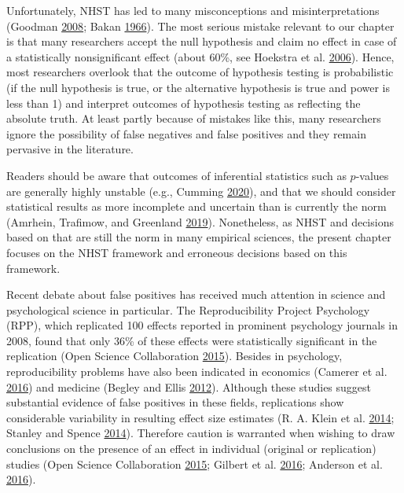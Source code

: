 \documentclass[a5paper]{book}
\begin{document}
Unfortunately, NHST has led to many misconceptions and
misinterpretations (Goodman
\protect\hyperlink{ref-doi:10.1053ux2fj.seminhematol.2008.04.003}{2008};
Bakan \protect\hyperlink{ref-doi:10.1037ux2fh0020412}{1966}). The most
serious mistake relevant to our chapter is that many researchers accept
the null hypothesis and claim no effect in case of a statistically
nonsignificant effect (about 60\%, see Hoekstra et al.
\protect\hyperlink{ref-doi:10.3758ux2fbf03213921}{2006}). Hence, most
researchers overlook that the outcome of hypothesis testing is
probabilistic (if the null hypothesis is true, or the alternative
hypothesis is true and power is less than 1) and interpret outcomes of
hypothesis testing as reflecting the absolute truth. At least partly
because of mistakes like this, many researchers ignore the possibility
of false negatives and false positives and they remain pervasive in the
literature.

Readers should be aware that outcomes of inferential statistics such as
\(p\)-values are generally highly unstable (e.g., Cumming
\protect\hyperlink{ref-isbn:9780415879682}{2020}), and that we should
consider statistical results as more incomplete and uncertain than is
currently the norm (Amrhein, Trafimow, and Greenland
\protect\hyperlink{ref-doi:10.1080ux2f00031305.2018.1543137}{2019}).
Nonetheless, as NHST and decisions based on that are still the norm in
many empirical sciences, the present chapter focuses on the NHST
framework and erroneous decisions based on this framework.

Recent debate about false positives has received much attention in
science and psychological science in particular. The Reproducibility
Project Psychology (RPP), which replicated 100 effects reported in
prominent psychology journals in 2008, found that only 36\% of these
effects were statistically significant in the replication (Open Science
Collaboration
\protect\hyperlink{ref-doi:10.1126ux2fscience.aac4716}{2015}). Besides
in psychology, reproducibility problems have also been indicated in
economics (Camerer et al.
\protect\hyperlink{ref-doi:10.1126ux2fscience.aaf0918}{2016}) and
medicine (Begley and Ellis
\protect\hyperlink{ref-doi:10.1038ux2f483531a}{2012}). Although these
studies suggest substantial evidence of false positives in these fields,
replications show considerable variability in resulting effect size
estimates (R. A. Klein et al.
\protect\hyperlink{ref-doi:10.1027ux2f1864-9335ux2fa000178}{2014};
Stanley and Spence
\protect\hyperlink{ref-doi:10.1177ux2f1745691614528518}{2014}).
Therefore caution is warranted when wishing to draw conclusions on the
presence of an effect in individual (original or replication) studies
(Open Science Collaboration
\protect\hyperlink{ref-doi:10.1126ux2fscience.aac4716}{2015}; Gilbert et
al. \protect\hyperlink{ref-doi:10.1126ux2fscience.aad7243}{2016};
Anderson et al.
\protect\hyperlink{ref-doi:10.1126ux2fscience.aad9163}{2016}).
\end{document}

